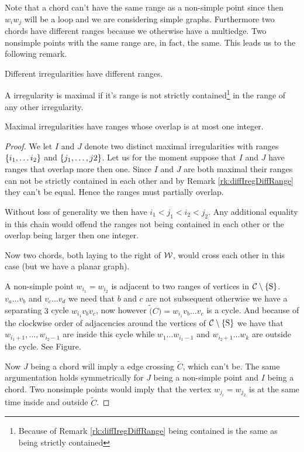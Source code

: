 Note that a chord can't have the same range as a non-simple point since then $w_i w_j$ will be a loop and we are considering simple graphs. Furthermore two chords have different ranges because we otherwise have a multiedge. Two nonsimple points with the same range are, in fact, the same. This leads us to the following remark. 
\begin{remark}
\label{rk:diffIregDiffRange}
Different irregularities have different ranges.
\end{remark}

\begin{defi}
A irregularity is maximal if it's range is not strictly contained\footnote{Because of Remark \ref{rk:diffIregDiffRange} being contained is the same as being strictly contained} in the range of any other irregularity.
\end{defi}

\begin{lemma}
Maximal irregularities have ranges whose overlap is at most one integer.
\end{lemma}
\begin{proof}
We let $I$ and $J$ denote two distinct maximal irregularities with ranges $\left\lbrace {i_1, \ldots i_2} \right\rbrace$ and $\left\lbrace {j_1, \ldots, j2} \right\rbrace$. Let us for the moment suppose that $I$ and $J$ have ranges that overlap more then one. Since $I$ and $J$ are both maximal their ranges can not be strictly contained in each other and by Remark \ref{rk:diffIregDiffRange} they can't be equal. Hence the ranges must partially overlap. 

Without loss of generality we then have $i_1 < j_1 < i_2 < j_2$. Any additional equality in this chain would offend the ranges not being contained in each other or the overlap being larger then one integer.

Now two chords, both laying to the right of $\mathcal{W}$, would cross each other in this case (but we have a planar graph).

A non-simple point $w_{i_1} = w_{i_2}$ is adjacent to two ranges of vertices in $\mathcal{C} \setminus \left\lbrace {\mathrm{S}} \right\rbrace$. $v_a \ldots v_b$ and $v_c \ldots v_d$ we need that $b$ and $c$ are not subsequent otherwise we have a separating $3$ cycle $w_{i_1} v_b v_c$, now however $\tilde(C) = w_{i_1} v_b \ldots v_c$ is a cycle. And because of the clockwise order of adjacencies around the vertices of $\mathcal{C} \setminus \left\lbrace {\mathrm{S}} \right\rbrace$ we have that $w_{i_1 +1}, \ldots, w_{i_2 -1}$ are inside this cycle while $ w_1 \ldots w_{i_1 -1}$ and $ w_{i_2 +1} \ldots w_k$ are outside the cycle. See Figure.  

Now $J$ being a chord will imply a edge crossing $\tilde{C}$, which can't be. The same argumentation holds symmetrically for $J$ being a non-simple point and $I$ being a chord. Two nonsimple points would imply that the vertex $w_{j_i} = w_{j_2}$ is at the same time inside and outside $\tilde{C}$. 
\end{proof}

